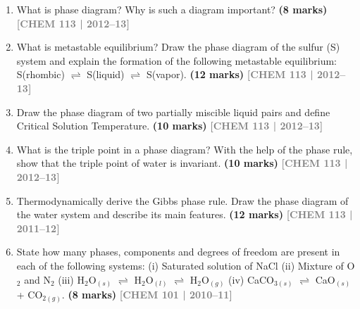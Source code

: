 \documentclass[12pt,a3paper]{article}
\newcommand{\yr}[1]{\hfill\textcolor{gray}{\small\textbf{[#1]}}}
\newcommand{\mk}[1]{\textcolor{orange!70!black}{\small\textbf{(#1 marks)}}}
\begin{document}
\begin{enumerate}




\item What is phase diagram? Why is such a diagram important? \mk{8}
\yr{CHEM 113 | 2012--13}





\item What is metastable equilibrium? Draw the phase diagram of the sulfur (S) system and explain the formation of the following metastable equilibrium: S(rhombic) $\rightleftharpoons$ S(liquid) $\rightleftharpoons$ S(vapor). \mk{12}
\yr{CHEM 113 | 2012--13}




\item Draw the phase diagram of two partially miscible liquid pairs and define Critical Solution Temperature. \mk{10}
\yr{CHEM 113 | 2012--13}




\item What is the triple point in a phase diagram? With the help of the phase rule, show that the triple point of water is invariant. \mk{10}
\yr{CHEM 113 | 2012--13}




\item Thermodynamically derive the Gibbs phase rule. Draw the phase diagram of the water system and describe its main features. \mk{12}
\yr{CHEM 113 | 2011--12}

\item State how many phases, components and degrees of freedom are present in each of the following systems: (i) Saturated solution of NaCl (ii) Mixture of O$_2$ and N$_2$ (iii) H$_2$O$_{(s)}$ $\rightleftharpoons$ H$_2$O$_{(l)}$ $\rightleftharpoons$ H$_2$O$_{(g)}$ (iv) CaCO$_{3(s)}$ $\rightleftharpoons$ CaO$_{(s)}$ + CO$_{2(g)}$. \mk{8}
\yr{CHEM 101 | 2010--11}





\end{enumerate}
\end{document}
